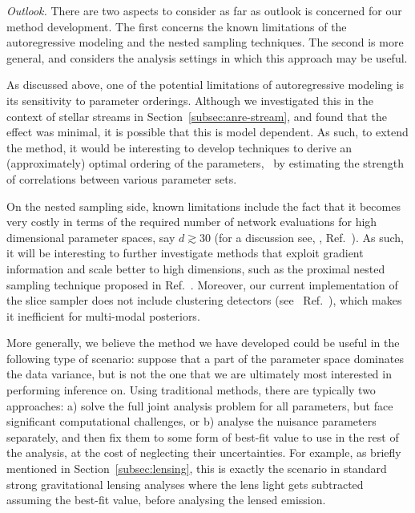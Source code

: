 \vspace{10pt}
 \emph{Outlook.} There are two aspects to consider as far as outlook is concerned for our method development. The first concerns the known limitations of the autoregressive modeling and the nested sampling techniques. The second is more general, and considers the analysis settings in which this approach may be useful.

As discussed above, one of the potential limitations of autoregressive modeling is its sensitivity to parameter orderings. Although we investigated this in the context of stellar streams in Section~\ref{subsec:anre-stream}, and found that the effect was minimal, it is possible that this is model dependent. As such, to extend the method, it would be interesting to develop techniques to derive an (approximately) optimal ordering of the parameters, \eg~by estimating the strength of correlations between various parameter sets. 

On the nested sampling side, known limitations include the fact that it becomes very costly in terms of the required number of network evaluations for high dimensional parameter spaces, say $d \gtrsim 30$ (for a discussion see, \eg, Ref.~\cite{Buchner:2021kpm}). As such, it will be interesting to further investigate methods that exploit gradient information and scale better to high dimensions, such as the proximal nested sampling technique proposed in Ref.~\cite{Cai:2002aa}. Moreover, our current implementation of the slice sampler does not include clustering detectors (see \eg~Ref.~\cite{Feroz:2007kg}), which makes it inefficient for multi-modal posteriors.

More generally, we believe the method we have developed could be useful in the following type of scenario: suppose that a part of the parameter space dominates the data variance, but is not the one that we are ultimately most interested in performing inference on. Using traditional methods, there are typically two approaches: a) solve the full joint analysis problem for all parameters, but face significant computational challenges, or b) analyse the nuisance parameters separately, and then fix them to some form of best-fit value to use in the rest of the analysis, at the cost of neglecting their uncertainties. For example, as briefly mentioned in Section~\ref{subsec:lensing}, this is exactly the scenario in standard strong gravitational lensing analyses where the lens light gets subtracted assuming the best-fit value, before analysing the lensed emission.

